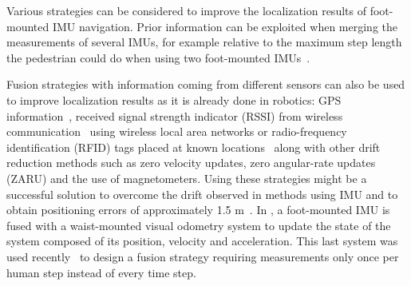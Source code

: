 Various strategies can be considered to improve the localization results of foot-mounted IMU navigation.
Prior information can be exploited when merging the measurements of several IMUs, for example relative to the maximum step length the pedestrian could do when using two foot-mounted IMUs~\cite{skog2012fusing}.

Fusion strategies with information coming from different sensors can also be used to improve localization results as it is already done
 in robotics: GPS information~\cite{sukkarieh1999high,hide2012investigating,gao2014data}, received signal strength indicator (RSSI) from wireless communication~\cite{malyavej2013indoor} using wireless local area networks or radio-frequency identification (RFID) tags placed at known locations~\cite{ruiz2012accurate}
along with other drift reduction methods such as zero velocity updates, zero angular-rate updates (ZARU) and the use of magnetometers.
Using these strategies might be a successful solution to overcome the drift observed in methods using IMU and to obtain positioning errors of approximately 1.5 m~\cite{ruiz2012accurate}.
In \cite{chdid2011inertial}, a foot-mounted IMU is fused with a waist-mounted visual odometry system to update the state of the system composed of its position, velocity and acceleration.
This last system was used recently~\cite{pierce2016incorporation} to design a fusion strategy requiring measurements only once per human step instead of every time step.

